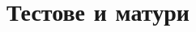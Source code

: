 \documentclass[12pt,a4paper]{article}
\begin{document}







\section{Тестове и матури}
\end{document}
